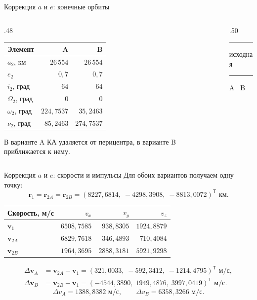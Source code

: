 \documentclass[11pt,aspectratio=169,t]{beamer}
\newcommand{\figurelegend}{%
 {\usebeamerfont{caption}\color{coursemuted}
 \textcolor{courseink}{\rule[.6ex]{5mm}{.5pt}} исходная\quad
 \textcolor{courseaccent}{\rule[.6ex]{5mm}{.6pt}} A\quad
 \textcolor{coursemuted}{\textendash\,\textendash} B\par}}
\begin{document}
\begin{frame}{Коррекция $a$ и $e$: конечные орбиты}
\begin{columns}[T,onlytextwidth]
\begin{column}{.48\textwidth}
\centering
\renewcommand{\arraystretch}{1.14}
\begin{tabular}{@{}lrr@{}}
\toprule
Элемент & A & B\\\midrule
$a_2$, км & $26\,554$ & $26\,554$\\
$e_2$ & $0{,}7$ & $0{,}7$\\
$i_2$, град & $64$ & $64$\\
$\Omega_2$, град & $0$ & $0$\\
$\omega_2$, град & $224{,}7537$ & $35{,}2463$\\
$\nu_2$, град & $85{,}2463$ & $274{,}7537$\\\bottomrule
\end{tabular}\par\medskip
\justifying
В варианте A КА удаляется от перицентра, в варианте B приближается к нему.
\end{column}
\begin{column}{.50\textwidth}
\centering\par\figurelegend
\end{column}
\end{columns}
\end{frame}

\begin{frame}{Коррекция $a$ и $e$: скорости и импульсы}
Для обоих вариантов получаем одну точку:
\[
\mathbf r_1=\mathbf r_{2A}=\mathbf r_{2B}
=(8227{,}6814,\;-4298{,}3908,\;-8813{,}0072)^{\mathsf T}\text{ км}.
\]
\centering
\renewcommand{\arraystretch}{1.04}
\begin{tabular}{@{}lrrr@{}}
\toprule
Скорость, м/с & $v_x$ & $v_y$ & $v_z$\\\midrule
$\mathbf v_1$ & $6508{,}7585$ & $938{,}8305$ & $1924{,}8879$\\
$\mathbf v_{2A}$ & $6829{,}7618$ & $346{,}4893$ & $710{,}4084$\\
$\mathbf v_{2B}$ & $1964{,}3695$ & $2888{,}3181$ & $5921{,}9298$\\\bottomrule
\end{tabular}\par
\begin{align*}
\Delta\mathbf v_A&=\mathbf v_{2A}-\mathbf v_1
=(321{,}0033,\;-592{,}3412,\;-1214{,}4795)^{\mathsf T}\text{ м/с},\\
\Delta\mathbf v_B&=\mathbf v_{2B}-\mathbf v_1
=(-4544{,}3890,\;1949{,}4876,\;3997{,}0419)^{\mathsf T}\text{ м/с}.
\end{align*}
\[
\boxed{\Delta v_A=1388{,}8382\text{ м/с}},\qquad
\boxed{\Delta v_B=6358{,}3266\text{ м/с}}.
\]
\end{frame}
\end{document}
